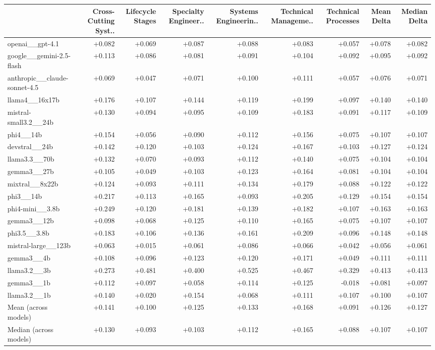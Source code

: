 \begin{tabular}{lrrrrrrrr}
\toprule
 & Cross-Cutting Syst.. & Lifecycle Stages & Specialty Engineer.. & Systems Engineerin.. & Technical Manageme.. & Technical Processes & Mean Delta & Median Delta \\
\midrule
openai\_\_gpt-4.1 & +0.082 & +0.069 & +0.087 & +0.088 & +0.083 & +0.057 & +0.078 & +0.082 \\
google\_\_gemini-2.5-flash & +0.113 & +0.086 & +0.081 & +0.091 & +0.104 & +0.092 & +0.095 & +0.092 \\
anthropic\_\_claude-sonnet-4.5 & +0.069 & +0.047 & +0.071 & +0.100 & +0.111 & +0.057 & +0.076 & +0.071 \\
llama4\_\_16x17b & +0.176 & +0.107 & +0.144 & +0.119 & +0.199 & +0.097 & +0.140 & +0.140 \\
mistral-small3.2\_\_24b & +0.130 & +0.094 & +0.095 & +0.109 & +0.183 & +0.091 & +0.117 & +0.109 \\
phi4\_\_14b & +0.154 & +0.056 & +0.090 & +0.112 & +0.156 & +0.075 & +0.107 & +0.107 \\
devstral\_\_24b & +0.142 & +0.120 & +0.103 & +0.124 & +0.167 & +0.103 & +0.127 & +0.124 \\
llama3.3\_\_70b & +0.132 & +0.070 & +0.093 & +0.112 & +0.140 & +0.075 & +0.104 & +0.104 \\
gemma3\_\_27b & +0.105 & +0.049 & +0.103 & +0.123 & +0.164 & +0.081 & +0.104 & +0.104 \\
mixtral\_\_8x22b & +0.124 & +0.093 & +0.111 & +0.134 & +0.179 & +0.088 & +0.122 & +0.122 \\
phi3\_\_14b & +0.217 & +0.113 & +0.165 & +0.093 & +0.205 & +0.129 & +0.154 & +0.154 \\
phi4-mini\_\_3.8b & +0.249 & +0.120 & +0.181 & +0.139 & +0.182 & +0.107 & +0.163 & +0.163 \\
gemma3\_\_12b & +0.098 & +0.068 & +0.125 & +0.110 & +0.165 & +0.075 & +0.107 & +0.107 \\
phi3.5\_\_3.8b & +0.183 & +0.106 & +0.136 & +0.161 & +0.209 & +0.096 & +0.148 & +0.148 \\
mistral-large\_\_123b & +0.063 & +0.015 & +0.061 & +0.086 & +0.066 & +0.042 & +0.056 & +0.061 \\
gemma3\_\_4b & +0.108 & +0.096 & +0.123 & +0.120 & +0.171 & +0.049 & +0.111 & +0.111 \\
llama3.2\_\_3b & +0.273 & +0.481 & +0.400 & +0.525 & +0.467 & +0.329 & +0.413 & +0.413 \\
gemma3\_\_1b & +0.112 & +0.097 & +0.058 & +0.114 & +0.125 & -0.018 & +0.081 & +0.097 \\
llama3.2\_\_1b & +0.140 & +0.020 & +0.154 & +0.068 & +0.111 & +0.107 & +0.100 & +0.107 \\
Mean (across models) & +0.141 & +0.100 & +0.125 & +0.133 & +0.168 & +0.091 & +0.126 & +0.127 \\
Median (across models) & +0.130 & +0.093 & +0.103 & +0.112 & +0.165 & +0.088 & +0.107 & +0.107 \\
\bottomrule
\end{tabular}

